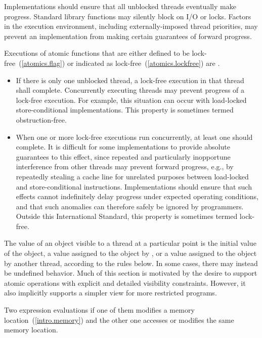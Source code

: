 \pnum
Implementations should ensure that all unblocked threads eventually make
progress. \enternote Standard library functions may silently block on I/O or
locks. Factors in the execution environment, including externally-imposed thread
priorities, may prevent an implementation from making certain guarantees of
forward progress. \exitnote

\pnum
Executions of atomic functions
that are either defined to be lock-free~(\ref{atomics.flag})
or indicated as lock-free~(\ref{atomics.lockfree})
are .
\begin{itemize}
\item
  If there is only one unblocked thread,
  a lock-free execution in that thread shall complete.
  \enternote
    Concurrently executing threads
    may prevent progress of a lock-free execution.
    For example,
    this situation can occur
    with load-locked store-conditional implementations.
    This property is sometimes termed obstruction-free.
  \exitnote
\item
  When one or more lock-free executions run concurrently,
  at least one should complete.
  \enternote
    It is difficult for some implementations
    to provide absolute guarantees to this effect,
    since repeated and particularly inopportune interference
    from other threads
    may prevent forward progress,
    e.g.,
    by repeatedly stealing a cache line
    for unrelated purposes
    between load-locked and store-conditional instructions.
    Implementations should ensure
    that such effects cannot indefinitely delay progress
    under expected operating conditions,
    and that such anomalies
    can therefore safely be ignored by programmers.
    Outside this International Standard,
    this property is sometimes termed lock-free.
  \exitnote
\end{itemize}

\pnum
The value of an object visible to a thread  at a particular point is the
initial value of the object, a value assigned to the object by , or a
value assigned to the object by another thread, according to the rules below.
\enternote In some cases, there may instead be undefined behavior. Much of this
section is motivated by the desire to support atomic operations with explicit
and detailed visibility constraints. However, it also implicitly supports a
simpler view for more restricted programs. \exitnote

\pnum
Two expression evaluations  if one of them modifies a memory
location~(\ref{intro.memory}) and the other one accesses or modifies the same
memory location.

